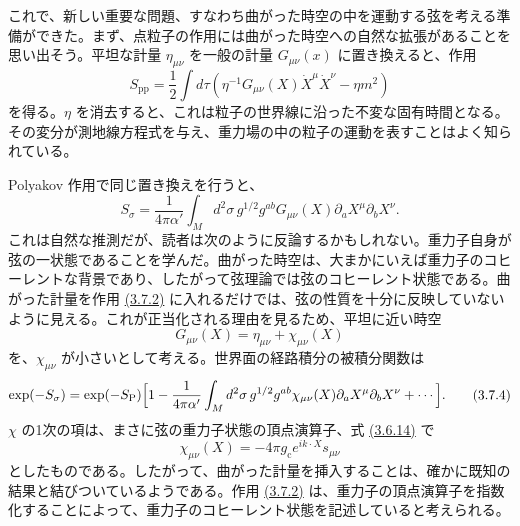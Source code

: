 \label{sec:3.7}

これで、新しい重要な問題、すなわち曲がった時空の中を運動する弦を考える準備ができた。まず、点粒子の作用には曲がった時空への自然な拡張があることを思い出そう。平坦な計量 $\eta_{\mu\nu}$ を一般の計量 $G_{\mu\nu}(x)$ に置き換えると、作用
\begin{equation}
S_{\mathrm{pp}}=\frac12\int d\tau
\left(\eta^{-1}G_{\mu\nu}(X)\dot X^\mu\dot X^\nu-\eta m^2\right)
\tag{3.7.1}\label{eq:3.7.1}
\end{equation}
を得る。$\eta$ を消去すると、これは粒子の世界線に沿った不変な固有時間となる。その変分が測地線方程式を与え、重力場の中の粒子の運動を表すことはよく知られている。

Polyakov 作用で同じ置き換えを行うと、
\begin{equation}
S_\sigma=\frac1{4\pi\alpha'}\int_M d^2\sigma\,g^{1/2}g^{ab}
G_{\mu\nu}(X)\partial_aX^\mu\partial_bX^\nu.
\tag{3.7.2}\label{eq:3.7.2}
\end{equation}
これは自然な推測だが、読者は次のように反論するかもしれない。重力子自身が弦の一状態であることを学んだ。曲がった時空は、大まかにいえば重力子のコヒーレントな背景であり、したがって弦理論では弦のコヒーレント状態である。曲がった計量を作用 \hyperref[eq:3.7.2]{(3.7.2)} に入れるだけでは、弦の性質を十分に反映していないように見える。これが正当化される理由を見るため、平坦に近い時空
\begin{equation}
G_{\mu\nu}(X)=\eta_{\mu\nu}+\chi_{\mu\nu}(X)
\tag{3.7.3}\label{eq:3.7.3}
\end{equation}
を、$\chi_{\mu\nu}$ が小さいとして考える。世界面の経路積分の被積分関数は
\begin{equation}
\begin{aligned}
\exp(-S_\sigma)=\exp(-S_{\mathrm P})
\Bigl[1-\frac1{4\pi\alpha'}\int_M d^2\sigma\,
g^{1/2}g^{ab}\chi_{\mu\nu}(X)
\partial_aX^\mu\partial_bX^\nu+\cdots\Bigr].
\end{aligned}
\tag{3.7.4}\label{eq:3.7.4}
\end{equation}
$\chi$ の1次の項は、まさに弦の重力子状態の頂点演算子、式 \hyperref[eq:3.6.14]{(3.6.14)} で
\begin{equation}
\chi_{\mu\nu}(X)=-4\pi g_{\mathrm c}e^{ik\cdot X}s_{\mu\nu}
\tag{3.7.5}\label{eq:3.7.5}
\end{equation}
としたものである。したがって、曲がった計量を挿入することは、確かに既知の結果と結びついているようである。作用 \hyperref[eq:3.7.2]{(3.7.2)} は、重力子の頂点演算子を指数化することによって、重力子のコヒーレント状態を記述していると考えられる。

